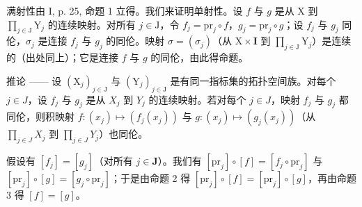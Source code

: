 满射性由 I, p. 25, 命题 1 立得。我们来证明单射性。设 \(f\) 与 \(g\) 是从 X 到 \(\prod_{j \in \mathrm{J}} \mathrm{Y}_j\) 的连续映射。对所有 \(j \in \mathrm{J}\)，令 \(f_j = \mathrm{pr}_j \circ f\)，\(g_j = \mathrm{pr}_j \circ g\)；设 \(f_j\) 与 \(g_j\) 同伦，\(\sigma_j\) 是连接 \(f_j\) 与 \(g_j\) 的同伦。映射 \(\sigma = (\sigma_j)\)（从 \(\mathrm{X} \times \mathbf{I}\) 到 \(\prod_{j \in \mathrm{J}} \mathrm{Y}_j\)）是连续的（出处同上）；它是连接 \(f\) 与 \(g\) 的同伦，由此得命题。

推论 —— 设 \((\mathrm{X}_{j})_{j\in\mathrm{J}}\) 与 \((\mathrm{Y}_{j})_{j\in\mathrm{J}}\) 是有同一指标集的拓扑空间族。对每个 \(j\in J\)，设 \(f_{j}\) 与 \(g_{j}\) 是从 \(X_{j}\) 到 \(Y_{j}\) 的连续映射。若对每个 \(j\in J\)，映射 \(f_{j}\) 与 \(g_{j}\) 都同伦，则积映射 \(f\colon(x_{j})\mapsto(f_{j}(x_{j}))\) 与 \(g\colon(x_{j})\mapsto(g_{j}(x_{j}))\)（从 \(\prod_{j\in J}X_{j}\) 到 \(\prod_{j\in J}Y_{j}\)）也同伦。

假设有 \([f_j] = [g_j]\)（对所有 \(j \in \mathbf{J}\)）。我们有 \([\mathrm{pr}_j] \circ [f] = [f_j \circ \mathrm{pr}_j]\) 与 \([\mathrm{pr}_j] \circ [g] = [g_j \circ \mathrm{pr}_j]\)；于是由命题 2 得 \([\mathrm{pr}_j] \circ [f] = [\mathrm{pr}_j] \circ [g]\)，再由命题 3 得 \([f] = [g]\)。

